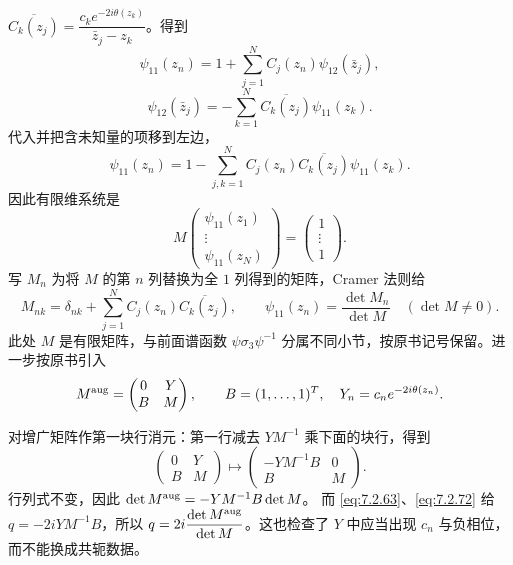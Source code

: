\documentclass[lang=cn,scheme=chinese,mode=simple,device=normal,color=blue,math=cm,thmcnt=section,12pt]{elegantbook}
\newcommand{\eqq}[2]{\tag{#1}\label{eq:#1}#2}
\begin{document}
$\overline{C_k(z_j)}=\dfrac{c_ke^{-2i\theta(z_k)}}{\bar z_j-z_k}$。得到
\begin{equation}
\eqq{7.2.69}{\psi_{11}(z_n)=1+\sum\limits_{j=1}^NC_j(z_n)\psi_{12}(\bar z_j),}
\end{equation}
\begin{equation}
\eqq{7.2.70}{\psi_{12}(\bar z_j)=-\sum\limits_{k=1}^N\overline{C_k(z_j)}\psi_{11}(z_k).}
\end{equation}
代入并把含未知量的项移到左边，
\begin{equation}
\eqq{7.2.71}{\psi_{11}(z_n)=1-\sum\limits_{j,k=1}^NC_j(z_n)\overline{C_k(z_j)}\psi_{11}(z_k).}
\end{equation}
因此有限维系统是
\begin{equation}
\eqq{7.2.72}{M\begin{pmatrix}\psi_{11}(z_1)\\\vdots\\\psi_{11}(z_N)\end{pmatrix}
=\begin{pmatrix}1\\\vdots\\1\end{pmatrix}.}
\end{equation}
写 $M_n$ 为将 $M$ 的第 $n$ 列替换为全 $1$ 列得到的矩阵，Cramer 法则给
\begin{equation}
\eqq{7.2.73}{M_{nk}=\delta_{nk}+\sum\limits_{j=1}^NC_j(z_n)\overline{C_k(z_j)},\qquad
\psi_{11}(z_n)=\dfrac{\det M_n}{\det M}\quad(\det M\ne0).}
\end{equation}
此处 $M$ 是有限矩阵，与前面谱函数 $\psi\sigma_3\psi^{-1}$ 分属不同小节，按原书记号保留。进一步按原书引入
\[
M^{\rm aug}=\begin{pmatrix}0&Y\\B&M\end{pmatrix},\qquad
B=(1,\ldots,1)^T,\quad Y_n=c_ne^{-2i\theta(z_n)}.
\]
\begin{callout}[计算：增广行列式怎样给出位势]
对增广矩阵作第一块行消元：第一行减去 $YM^{-1}$ 乘下面的块行，得到
\[
\begin{pmatrix}0&Y\\B&M\end{pmatrix}
\longmapsto\begin{pmatrix}-YM^{-1}B&0\\B&M\end{pmatrix}.
\]
行列式不变，因此 $\det M^{\rm aug}=-YM^{-1}B\det M$。
而 \eqref{eq:7.2.63}、\eqref{eq:7.2.72} 给 $q=-2iYM^{-1}B$，所以
$q=2i\dfrac{\det M^{\rm aug}}{\det M}$。这也检查了 $Y$ 中应当出现 $c_n$ 与负相位，而不能换成共轭数据。
\end{callout}
\end{document}

